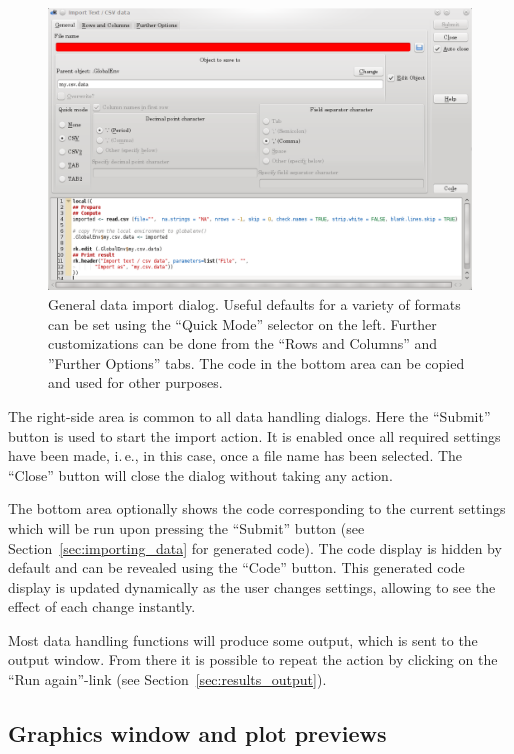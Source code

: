 \begin{figure}[b!]
 \centering
 \includegraphics[width=14.99cm]{./figures/CSV_import.png}
 \caption{General data import dialog. Useful defaults for a variety of formats can
  be set using the ``Quick Mode'' selector on the left. Further customizations can be done
  from the ``Rows and Columns'' and ''Further Options'' tabs. The 
  code in the bottom area can be copied and used for other purposes.}
 \label{fig:CSV_import}
\end{figure}

The right-side area is common to all data handling
dialogs. Here the ``Submit'' button is used
to start the import action. It is enabled once all required
settings have been made, i.\,e., in this case, once a file name has been
selected. The ``Close'' button will close the
dialog without taking any action.

The bottom area optionally shows the 
code corresponding to the current settings  which will be run
upon pressing the ``Submit'' button (see Section~\ref{sec:importing_data} for generated  code). 
The code display is hidden by default and can be revealed using
the ``Code'' button. This 
generated code display is updated dynamically as the user changes settings, allowing
to see the effect of each change instantly.

Most data handling functions will produce some output, which is
sent to the output window. From there it is possible to repeat the
action by clicking on the ``Run again''-link
(see Section~\ref{sec:results_output}).

\subsection{Graphics window and plot previews}
\label{sec:plot_previews}


